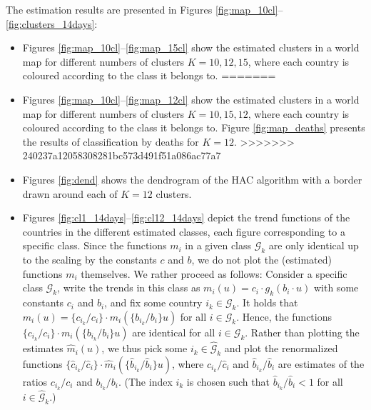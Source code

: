\documentclass[a4paper,12pt]{article}
\numberwithin{equation}{section}
\begin{document}
The estimation results are presented in Figures \ref{fig:map_10cl}--\ref{fig:clusters_14days}:
\begin{itemize}[leftmargin=0.6cm]
<<<<<<< HEAD
\item Figures \ref{fig:map_10cl}--\ref{fig:map_15cl} show the estimated clusters in a world map for different numbers of clusters $K =10, 12, 15$, where each country is coloured according to the class it belongs to. 
=======
\item Figures \ref{fig:map_10cl}--\ref{fig:map_12cl} show the estimated clusters in a world map for different numbers of clusters $K =10, 15, 12$, where each country is coloured according to the class it belongs to. Figure \ref{fig:map_deaths} presents the results of classification by deaths for $K =12$.
>>>>>>> 240237a12058308281bc573d491f51a086ac77a7
\item Figures \ref{fig:dend} shows the dendrogram of the HAC algorithm with a border drawn around each of $K = 12$ clusters.
\item Figures \ref{fig:cl1_14days}--\ref{fig:cl12_14days} depict the trend functions of the countries in the different estimated classes, each figure corresponding to a specific class. Since the functions $m_i$ in a given class $\mathcal{G}_k$ are only identical up to the scaling by the constants $c$ and $b$, we do not plot the (estimated) functions $m_i$ themselves. We rather proceed as follows: Consider a specific class $\mathcal{G}_k$,  write the trends in this class as $m_i(u) = c_i \cdot g_k(b_i \cdot u)$ with some constants $c_i$ and $b_i$, and fix some country $i_k \in \mathcal{G}_k$. It holds that $m_i(u) = \{ c_{i_k}/c_i \} \cdot m_i(\{ b_{i_k}/b_i \} u)$ for all $i \in \mathcal{G}_k$. Hence, the functions $\{ c_{i_k}/c_i \} \cdot m_i(\{ b_{i_k}/b_i \} u)$ are identical for all $i \in \mathcal{G}_k$. Rather than plotting the estimates $\hat{m}_i(u)$, we thus pick some $i_k \in \hat{\mathcal{G}}_k$ and plot the renormalized functions $\{ \hat{c}_{i_k}/\hat{c}_i \} \cdot \hat{m}_i(\{ \hat{b}_{i_k}/\hat{b}_i \} u)$, where $\hat{c}_{i_k}/\hat{c}_i$ and $\hat{b}_{i_k}/\hat{b}_i$ are estimates of the ratios $c_{i_k}/c_i$ and $b_{i_k}/b_i$. (The index $i_k$ is chosen such that $\hat{b}_{i_k}/\hat{b}_i < 1$ for all $i \in \hat{\mathcal{G}}_k$.)
\end{itemize}

\end{document}
